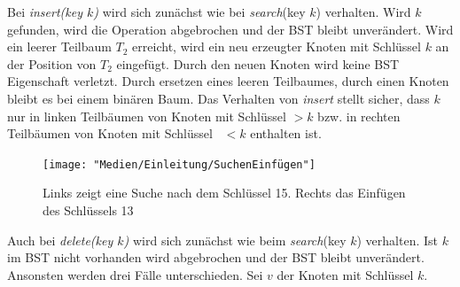 \documentclass[a4paper,12pt]{article}
\begin{document}
Bei \textit{insert(key $k$)} wird sich zunächst wie bei  \textit{search}(key $k$) verhalten. Wird $k$ gefunden, wird die Operation abgebrochen und der BST bleibt unverändert. Wird ein leerer Teilbaum $T_2$ erreicht, wird ein neu erzeugter Knoten mit Schlüssel $k$ an der Position von $T_2$ eingefügt. Durch den neuen Knoten wird keine BST Eigenschaft verletzt. Durch ersetzen eines leeren Teilbaumes, durch einen Knoten bleibt es bei einem binären Baum. Das Verhalten von  \textit{insert} stellt sicher, dass $k$ nur in linken Teilbäumen von Knoten mit Schlüssel $> k$ bzw. in rechten Teilbäumen von Knoten mit Schlüssel~ $< k$ enthalten ist.    \\
\begin{figure}[h]
	\centering
	\texttt{[image: "Medien/Einleitung/SuchenEinfügen"]}
	\caption{Links zeigt eine Suche nach dem Schlüssel 15. Rechts das Einfügen des Schlüssels 13}
	\label{fig:SuchenEinfügen}
\end{figure}
\noindent Auch bei \textit{delete(key $k$)} wird sich zunächst wie beim  \textit{search}(key $k$) verhalten. Ist $k$ im BST nicht vorhanden wird abgebrochen und der BST bleibt unverändert. Ansonsten werden drei Fälle unterschieden.
Sei $v$ der Knoten mit Schlüssel $k$.
\end{document}
